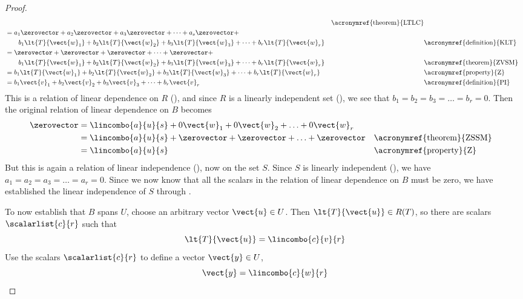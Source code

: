\begin{proof}
\begin{align*}
&&\text{\acronymref{theorem}{LTLC}}\\
%
&=a_1\zerovector+a_2\zerovector+a_3\zerovector+\cdots+a_s\zerovector+\\
&\quad\quad b_1\lt{T}{\vect{w}_1}+b_2\lt{T}{\vect{w}_2}+b_3\lt{T}{\vect{w}_3}+\cdots+b_r\lt{T}{\vect{w}_r}
&&\text{\acronymref{definition}{KLT}}\\
%
&=\zerovector+\zerovector+\zerovector+\cdots+\zerovector+\\
&\quad\quad b_1\lt{T}{\vect{w}_1}+b_2\lt{T}{\vect{w}_2}+b_3\lt{T}{\vect{w}_3}+\cdots+b_r\lt{T}{\vect{w}_r}
&&\text{\acronymref{theorem}{ZVSM}}\\
%
&=b_1\lt{T}{\vect{w}_1}+b_2\lt{T}{\vect{w}_2}+b_3\lt{T}{\vect{w}_3}+\cdots+b_r\lt{T}{\vect{w}_r}&&\text{\acronymref{property}{Z}}\\
%
&=b_1\vect{v}_1+b_2\vect{v}_2+b_3\vect{v}_3+\cdots+b_r\vect{v}_r&&\text{\acronymref{definition}{PI}}
\end{align*}
%
This is a relation of linear dependence on $R$ (), and since $R$ is a linearly independent set (), we see that $b_1=b_2=b_3=\ldots=b_r=0$.  Then the original relation of linear dependence on $B$ becomes
%
\begin{align*}
\zerovector&=\lincombo{a}{u}{s}+0\vect{w}_1+0\vect{w}_2+\ldots+0\vect{w}_r\\
&=\lincombo{a}{u}{s}+\zerovector+\zerovector+\ldots+\zerovector&&\text{\acronymref{theorem}{ZSSM}}\\
&=\lincombo{a}{u}{s}&&\text{\acronymref{property}{Z}}
\end{align*}
%
But this is again a relation of linear independence (), now on the set $S$.  Since $S$ is linearly independent (), we have $a_1=a_2=a_3=\ldots=a_r=0$.  Since we now know that all the scalars in the relation of linear dependence on $B$ must be zero, we have established the linear independence of $S$ through .\par
%
To now establish that $B$ spans $U$, choose an arbitrary vector $\vect{u}\in U$.  Then $\lt{T}{\vect{u}}\in R(T)$, so there are scalars $\scalarlist{c}{r}$ such that 
%
\begin{equation*}
\lt{T}{\vect{u}}=\lincombo{c}{v}{r}
\end{equation*}
%
Use the scalars $\scalarlist{c}{r}$ to define a vector $\vect{y}\in U$,
%
\begin{equation*}
\vect{y}=\lincombo{c}{w}{r}
\end{equation*}

\end{proof}

